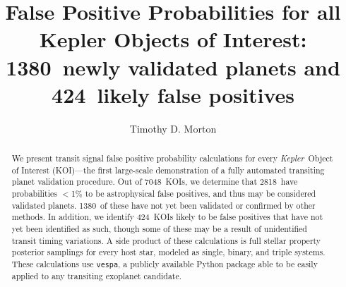 \documentclass{emulateapj}
\newcommand{\ncalc}{7048}
\newcommand{\nval}{2818}
\newcommand{\nvalnew}{1380}
\newcommand{\nfpnew}{424}
\newcommand{\kepler}{\textit{Kepler}}
\newcommand{\vespa}{\texttt{vespa}}
\begin{document}

\title{False Positive Probabilities for all Kepler Objects of Interest: \\
        \nvalnew\ newly validated planets and \nfpnew\ likely false positives}


\author{Timothy D. Morton}



\begin{abstract}
We present transit signal false positive probability calculations for
every \kepler\ Object of Interest (KOI)---the first large-scale
demonstration of a fully automated transiting planet validation
procedure.  Out of \ncalc\ KOIs, we determine that \nval\ have
probabilities $<$1\% to be astrophysical false positives, and thus may
be considered validated planets.  \nvalnew\ of these have not yet been
validated or confirmed by other methods.  In addition, we identify
\nfpnew\ KOIs likely to be false positives that have not yet been
identified as such, though some of these may be a result of
unidentified transit timing variations. A side product of these
calculations is full stellar property posterior samplings for every
host star, modeled as single, binary, and triple systems.  These
calculations use \vespa, a publicly available Python package able to
be easily applied to any transiting exoplanet candidate.
\end{abstract}

\end{document}
